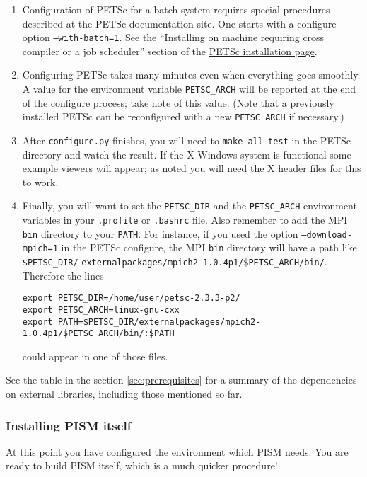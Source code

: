 \documentclass[11pt,final]{amsart}
\begin{document}
\begin{enumerate}
\begin{enumerate}
\item Configuration of PETSc for a batch system requires special procedures described at the PETSc documentation site.  One starts with a configure option \texttt{--with-batch=1}.  See the ``Installing on machine requiring cross compiler or a job scheduler'' section of the \href{http://www-unix.mcs.anl.gov/petsc/petsc-2/documentation/installation.html}{PETSc installation page}.

\item  Configuring PETSc takes many minutes even when everything goes smoothly.   A value for the environment variable \texttt{PETSC_ARCH} will be reported at the end of the configure process; take note of this value.  (Note that a previously installed PETSc can be reconfigured with a new \texttt{PETSC_ARCH} if necessary.)

\item  After \texttt{configure.py} finishes, you will need to \texttt{make all test} in the PETSc directory and watch the result.  If the X Windows system is functional some example viewers will appear; as noted you will need the X header files for this to work.

\item Finally, you will want to set the \texttt{PETSC_DIR} and the \texttt{PETSC_ARCH} environment variables in your \texttt{.profile} or \texttt{.bashrc} file.  Also remember to add the MPI \texttt{bin} directory to your \texttt{PATH}.  For instance, if you used the option \texttt{--download-mpich=1} in the PETSc configure, the MPI \texttt{bin} directory will have a path like \texttt{\$PETSC_DIR/} \texttt{externalpackages/mpich2-1.0.4p1/\$PETSC_ARCH/bin/}.  Therefore the lines 
\begin{verbatim}
export PETSC_DIR=/home/user/petsc-2.3.3-p2/
export PETSC_ARCH=linux-gnu-cxx
export PATH=$PETSC_DIR/externalpackages/mpich2-1.0.4p1/$PETSC_ARCH/bin/:$PATH
\end{verbatim}
\noindent could appear in one of those files.
\end{enumerate}
\end{enumerate}
\medskip See the table in the section \ref{sec:prerequisites} for a summary of the dependencies on external libraries, including
those mentioned so far.

\subsubsection{Installing PISM itself}
\label{sec:pism-itself}
At this point you have configured the environment which PISM needs.  You are ready to build PISM itself, which is a much quicker procedure!
\end{document}
